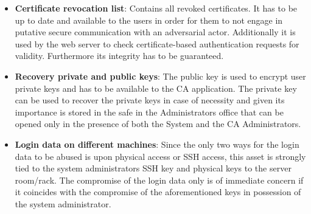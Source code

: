 \documentclass[english]{article}
\begin{document}
\begin{itemize}
\item \textbf{Certificate revocation list}: Contains all revoked certificates. It has to be up to date and available to the users in order for them to not engage in putative secure communication with an adversarial actor.
Additionally it is used by the web server to check certificate-based authentication requests for validity. Furthermore its integrity has to be guaranteed.
\item \textbf{Recovery private and public keys}: The public key is used to encrypt user private keys and has to be available to the CA application. The private key can be used to recover the private keys in case of necessity and given its importance is stored in the safe in the Administrators office that can be opened only in the presence of both the System and the CA Administrators.
\item \textbf{Login data on different machines}: Since the only two ways for the login data to be abused is upon physical access or SSH access, this asset is strongly tied to the system administrators SSH key and physical keys to the server room/rack.
The compromise of the login data only is of immediate concern if it coincides with the compromise of the aforementioned keys in possession of the system administrator.
\end{itemize}
\end{document}
